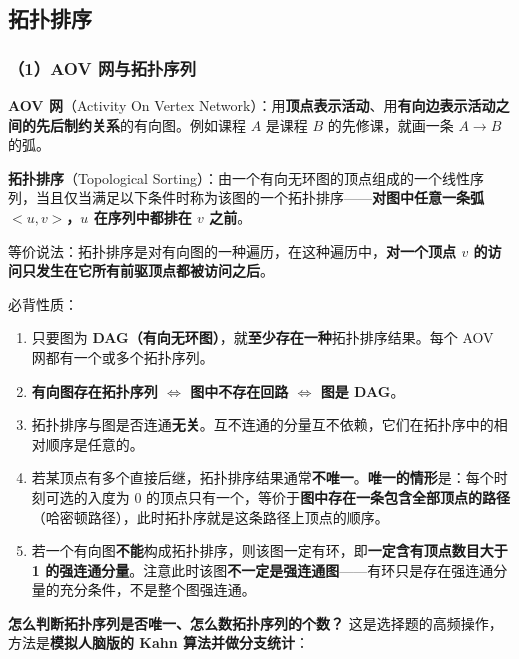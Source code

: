 \documentclass[11pt,openany,UTF8]{ctexbook}
\begin{document}
\subsection{拓扑排序}

\subsubsection{（1）AOV 网与拓扑序列}

\textbf{AOV 网}（Activity On Vertex Network）：用\textbf{顶点表示活动}、用\textbf{有向边表示活动之间的先后制约关系}的有向图。例如课程 $A$ 是课程 $B$ 的先修课，就画一条 $A\to B$ 的弧。

\textbf{拓扑排序}（Topological Sorting）：由一个有向无环图的顶点组成的一个线性序列，当且仅当满足以下条件时称为该图的一个拓扑排序——\textbf{对图中任意一条弧 $<u,v>$，$u$ 在序列中都排在 $v$ 之前}。

等价说法：拓扑排序是对有向图的一种遍历，在这种遍历中，\textbf{对一个顶点 $v$ 的访问只发生在它所有前驱顶点都被访问之后}。

必背性质：

\begin{enumerate}
\item 只要图为 \textbf{DAG（有向无环图）}，就\textbf{至少存在一种}拓扑排序结果。每个 AOV 网都有一个或多个拓扑序列。
\item \textbf{有向图存在拓扑序列 $\Leftrightarrow$ 图中不存在回路 $\Leftrightarrow$ 图是 DAG}。
\item 拓扑排序与图是否连通\textbf{无关}。互不连通的分量互不依赖，它们在拓扑序中的相对顺序是任意的。
\item 若某顶点有多个直接后继，拓扑排序结果通常\textbf{不唯一}。\textbf{唯一的情形}是：每个时刻可选的入度为 0 的顶点只有一个，等价于\textbf{图中存在一条包含全部顶点的路径}（哈密顿路径），此时拓扑序就是这条路径上顶点的顺序。
\item 若一个有向图\textbf{不能}构成拓扑排序，则该图一定有环，即\textbf{一定含有顶点数目大于 1 的强连通分量}。注意此时该图\textbf{不一定是强连通图}——有环只是存在强连通分量的充分条件，不是整个图强连通。
\end{enumerate}
\textbf{怎么判断拓扑序列是否唯一、怎么数拓扑序列的个数？} 这是选择题的高频操作，方法是\textbf{模拟人脑版的 Kahn 算法并做分支统计}：
\end{document}
